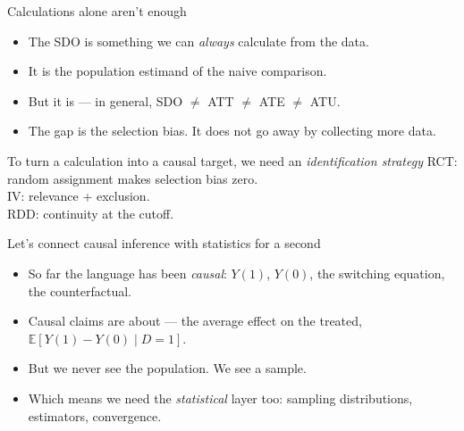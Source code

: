 \documentclass[aspectratio=169,11pt]{beamer}
\begin{document}
\begin{frame}{Calculations alone aren't enough}
\vspace{0.5em}
\begin{itemize}
  \item The SDO is something we can \textit{always} calculate from the data.
  \item It is the population estimand of the naive comparison.
  \item But it is  --- in general, SDO $\neq$ ATT $\neq$ ATE $\neq$ ATU.
  \item The gap is the selection bias. It does not go away by collecting more data.
\end{itemize}
\vspace{0.6em}
\begin{block}{To turn a calculation into a causal target, we need an \textit{identification strategy}}
RCT: random assignment makes selection bias zero. \\
IV: relevance + exclusion. \\
RDD: continuity at the cutoff. \\
\end{block}
\end{frame}

\begin{frame}{Let's connect causal inference with statistics for a second}
\vspace{0.6em}
\begin{itemize}
  \item So far the language has been \textit{causal}: $Y(1)$, $Y(0)$, the switching equation, the counterfactual.
  \item Causal claims are about  --- the average effect on the treated, $\mathbb{E}[Y(1) - Y(0) \mid D = 1]$.
  \item But we never see the population. We see a sample.
  \item Which means we need the \textit{statistical} layer too: sampling distributions, estimators, convergence.
\end{itemize}
\vspace{0.6em}
\end{frame}
\end{document}
